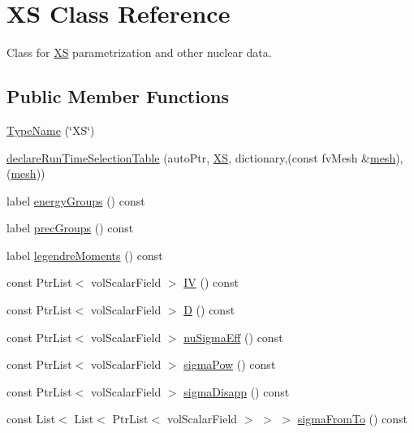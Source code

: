 \hypertarget{classFoam_1_1XS}{}\section{XS Class Reference}
\label{classFoam_1_1XS}


Class for \hyperlink{classFoam_1_1XS}{XS} parametrization and other nuclear data.  


\subsection*{Public Member Functions}
\begin{DoxyCompactItemize}
\item 
\hyperlink{classFoam_1_1XS_a505c0bff76aae4fd2564ecdc6d31e501}{Type\+Name} (\char`\"{}XS\char`\"{})
\item 
\hyperlink{classFoam_1_1XS_a83cc058a37d82e00893b94e84e7ddc75}{declare\+Run\+Time\+Selection\+Table} (auto\+Ptr, \hyperlink{classFoam_1_1XS}{XS}, dictionary,(const fv\+Mesh \&\hyperlink{createMeshesPostProcess_8H_a8bb1e58291d2d2b653e024a4f4bffe38}{mesh}),(\hyperlink{createMeshesPostProcess_8H_a8bb1e58291d2d2b653e024a4f4bffe38}{mesh}))
\item 
label \hyperlink{classFoam_1_1XS_a4ac79b302698620f0566eac803ba02d3}{energy\+Groups} () const
\item 
label \hyperlink{classFoam_1_1XS_aeb1380355ff0a9cc7ab7e8b55aea673b}{prec\+Groups} () const
\item 
label \hyperlink{classFoam_1_1XS_ab1770d82e9777642e1373706c733606d}{legendre\+Moments} () const
\item 
const Ptr\+List$<$ vol\+Scalar\+Field $>$ \hyperlink{classFoam_1_1XS_af7bd963d20dabfe2e8c89aefe489694a}{IV} () const
\item 
const Ptr\+List$<$ vol\+Scalar\+Field $>$ \hyperlink{classFoam_1_1XS_a183948adfa6649ba954e96d3ff1fb262}{D} () const
\item 
const Ptr\+List$<$ vol\+Scalar\+Field $>$ \hyperlink{classFoam_1_1XS_a2d54b65ba527abfbece66dee3572e935}{nu\+Sigma\+Eff} () const
\item 
const Ptr\+List$<$ vol\+Scalar\+Field $>$ \hyperlink{classFoam_1_1XS_aa3757df4a20f8fb067a76e9acb069849}{sigma\+Pow} () const
\item 
const Ptr\+List$<$ vol\+Scalar\+Field $>$ \hyperlink{classFoam_1_1XS_aa09312f1afef2b2c3841e527175493b0}{sigma\+Disapp} () const
\item 
const List$<$ List$<$ Ptr\+List$<$ vol\+Scalar\+Field $>$ $>$ $>$ \hyperlink{classFoam_1_1XS_a1e4c802aa11f66b27a8294a66e83aa6e}{sigma\+From\+To} () const

\end{DoxyCompactItemize}
